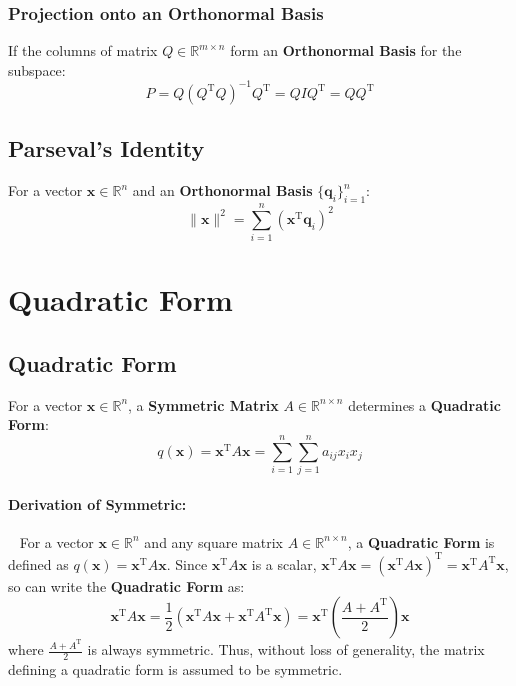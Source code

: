 \documentclass{article}
\begin{document}
\subsubsection{Projection onto an Orthonormal Basis}
If the columns of matrix $Q \in \mathbb{R}^{m \times n}$ form an \textbf{Orthonormal Basis} for the subspace:
\[
    P = Q(Q^{\mathrm{T}}Q)^{-1}Q^{\mathrm{T}} = QIQ^{\mathrm{T}} = QQ^{\mathrm{T}}
\]

\subsection{Parseval's Identity}
For a vector $\mathbf{x} \in \mathbb{R}^n$ and an \textbf{Orthonormal Basis} $\{\mathbf{q}_i\}_{i=1}^n$:
\[
    \|\mathbf{x}\|^2 = \sum_{i=1}^n (\mathbf{x}^{\mathrm{T}} \mathbf{q}_i)^2
\]


\newpage
\section{Quadratic Form}

\subsection{Quadratic Form}

For a vector $\mathbf{x} \in \mathbb{R}^n$, a \textbf{Symmetric Matrix} $A \in \mathbb{R}^{n \times n}$ determines a \textbf{Quadratic Form}:
\[
    q(\mathbf{x}) = \mathbf{x}^{\mathrm{T}} A \mathbf{x} = \sum_{i=1}^n \sum_{j=1}^n a_{ij} x_i x_j
\]
\paragraph{Derivation of Symmetric:}~
\newline
For a vector $\mathbf{x} \in \mathbb{R}^n$ and any square matrix $A \in \mathbb{R}^{n \times n}$, a \textbf{Quadratic Form} is defined as $q(\mathbf{x}) = \mathbf{x}^{\mathrm{T}} A \mathbf{x}$.
\newline
Since $\mathbf{x}^{\mathrm{T}} A \mathbf{x}$ is a scalar, $\mathbf{x}^{\mathrm{T}} A \mathbf{x} = (\mathbf{x}^{\mathrm{T}} A \mathbf{x})^{\mathrm{T}} = \mathbf{x}^{\mathrm{T}} A^{\mathrm{T}} \mathbf{x}$, so can write the \textbf{Quadratic Form} as:
\[
    \mathbf{x}^{\mathrm{T}} A \mathbf{x} = \frac{1}{2} (\mathbf{x}^{\mathrm{T}} A \mathbf{x} + \mathbf{x}^{\mathrm{T}} A^{\mathrm{T}} \mathbf{x}) = \mathbf{x}^{\mathrm{T}} \left( \frac{A + A^{\mathrm{T}}}{2} \right) \mathbf{x}
\]
where $\frac{A + A^{\mathrm{T}}}{2}$ is always symmetric.
\newline
Thus, without loss of generality, the matrix defining a quadratic form is assumed to be symmetric.
\end{document}
